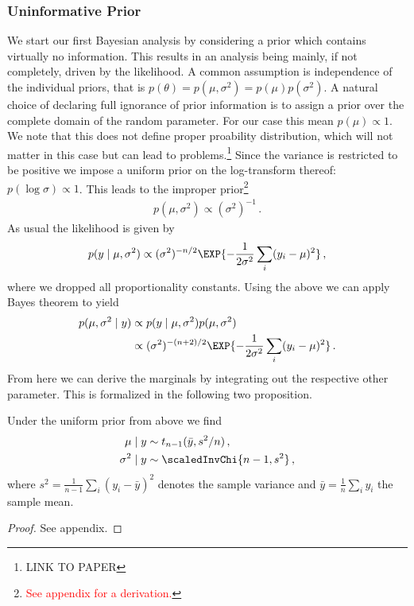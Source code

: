 \subsubsection*{Uninformative Prior}
We start our first Bayesian analysis by considering a prior which contains virtually no information.
This results in an analysis being mainly, if not completely, driven by the likelihood.
A common assumption is independence of the individual priors, that is $p(\theta) = p(\mu, \sigma^2) = p(\mu) p(\sigma^2)$.
A natural choice of declaring full ignorance of prior information is to assign a prior over the complete domain of the random parameter. For our case this mean $p(\mu) \propto 1$.
We note that this does not define proper proability distribution, which will not matter in this case but can lead to problems.\footnote{LINK TO PAPER}
Since the variance is restricted to be positive we impose a uniform prior on the log-transform thereof: $p(\log \sigma) \propto 1$.
This leads to the improper prior\footnote{\textcolor{red}{See appendix for a derivation.}}
\begin{align}
  p(\mu, \sigma^2) \propto (\sigma^2)^{-1} \,.
\end{align}
As usual the likelihood is given by
\begin{align}
  p(y \mid \mu, \sigma^2) \propto (\sigma^2)^{-n/2} \EXP{-\frac{1}{2\sigma^2}\sum_i (y_i - \mu)^2} \,,
\end{align}
where we dropped all proportionality constants.
Using the above we can apply Bayes theorem to yield
\begin{align}
  p(\mu, \sigma^2 \mid y) &\propto p(y \mid \mu, \sigma^2) p(\mu, \sigma^2)\\
  &\propto (\sigma^2)^{-(n+2)/2} \EXP{-\frac{1}{2\sigma^2}\sum_i (y_i - \mu)^2} \,.
\end{align}
From here we can derive the marginals by integrating out the respective other parameter. This is formalized in the following two proposition.

\begin{proposition}
  Under the uniform prior from above we find
  \begin{align}
    \mu \mid y &\sim t_{n-1}(\bar{y}, s^2/n) \,,\\
    \sigma^2 \mid y &\sim \scaledInvChi{n-1, s^2} \,,
  \end{align}
  where $s^2 = \frac{1}{n-1} \sum_i (y_i - \bar{y})^2$ denotes the sample variance and $\bar{y} = \frac{1}{n} \sum_i y_i$ the sample mean.
\end{proposition}
\begin{proof}
See appendix.
\end{proof}

